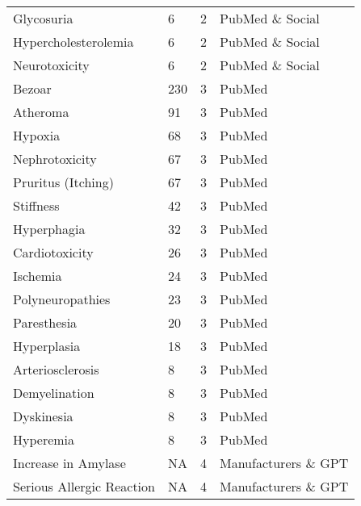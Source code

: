\documentclass[referee,bst/sn-basic]{sn-jnl}%
\begin{document}
\begin{appendices}
\begin{longtable}{llll}
Glycosuria                               & 6         & 2    & PubMed \& Social        \\
Hypercholesterolemia                     & 6         & 2    & PubMed \& Social        \\
Neurotoxicity                            & 6         & 2    & PubMed \& Social        \\
Bezoar                                   & 230       & 3    & PubMed                  \\
Atheroma                                 & 91        & 3    & PubMed                  \\
Hypoxia                                  & 68        & 3    & PubMed                  \\
Nephrotoxicity                           & 67        & 3    & PubMed                  \\
Pruritus (Itching)                       & 67        & 3    & PubMed                  \\
Stiffness                                & 42        & 3    & PubMed                  \\
Hyperphagia                              & 32        & 3    & PubMed                  \\
Cardiotoxicity                           & 26        & 3    & PubMed                  \\
Ischemia                                 & 24        & 3    & PubMed                  \\
Polyneuropathies                         & 23        & 3    & PubMed                  \\
Paresthesia                              & 20        & 3    & PubMed                  \\
Hyperplasia                              & 18        & 3    & PubMed                  \\
Arteriosclerosis                         & 8         & 3    & PubMed                  \\
Demyelination                            & 8         & 3    & PubMed                  \\
Dyskinesia                               & 8         & 3    & PubMed                  \\
Hyperemia                                & 8         & 3    & PubMed                  \\
Increase in Amylase                      & NA        & 4    & Manufacturers \& GPT    \\
Serious Allergic Reaction                & NA        & 4    & Manufacturers \& GPT    \\

\end{longtable}
\end{appendices}
\end{document}
